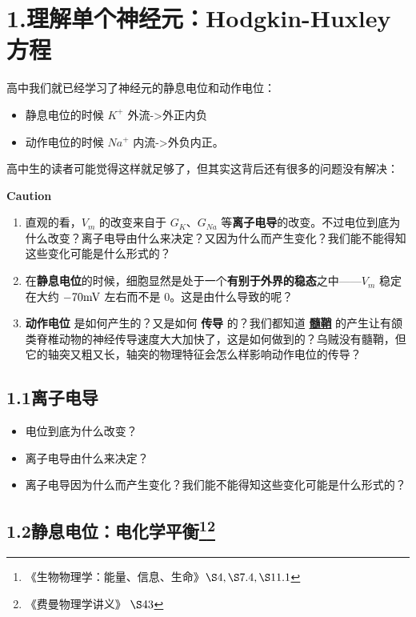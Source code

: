 \documentclass[
]{article}
\begin{document}
\section{1.理解单个神经元：Hodgkin-Huxley
方程}\label{1ux7406ux89e3ux5355ux4e2aux795eux7ecfux5143hodgkin-huxley-ux65b9ux7a0b}

高中我们就已经学习了神经元的静息电位和动作电位：

\begin{itemize}
\item
  静息电位的时候 \(K^+\) 外流-\textgreater 外正内负
\item
  动作电位的时候 \(Na^+\) 内流-\textgreater 外负内正。
\end{itemize}

高中生的读者可能觉得这样就足够了，但其实这背后还有很多的问题没有解决：

\textbf{Caution}\\

\begin{enumerate}
\def\labelenumi{\arabic{enumi}.}
\item
  直观的看，\(V_m\) 的改变来自于 \(G_K\)、\(G_{Na}\)
  等\textbf{离子电导}的改变。不过电位到底为什么改变？离子电导由什么来决定？又因为什么而产生变化？我们能不能得知这些变化可能是什么形式的？
\item
  在\textbf{静息电位}的时候，细胞显然是处于一个\textbf{有别于外界的稳态}之中------\(V_m\)
  稳定在大约 \(-70\rm mV\) 左右而不是 \(0\)。这是由什么导致的呢？
\item
  \textbf{动作电位} 是如何产生的？又是如何 \textbf{传导} 的？我们都知道
  \textbf{\href{https://en.wikipedia.org/wiki/Myelin}{髓鞘}}
  的产生让有颌类脊椎动物的神经传导速度大大加快了，这是如何做到的？乌贼没有髓鞘，但它的轴突又粗又长，轴突的物理特征会怎么样影响动作电位的传导？
\end{enumerate}

\subsection{1.1离子电导}\label{11ux79bbux5b50ux7535ux5bfc}

\begin{itemize}
\item
  电位到底为什么改变？
\item
  离子电导由什么来决定？
\item
  离子电导因为什么而产生变化？我们能不能得知这些变化可能是什么形式的？
\end{itemize}

\subsection[1.2静息电位：电化学平衡]{\texorpdfstring{1.2静息电位：电化学平衡\footnote{《生物物理学：能量、信息、生命》\(\S4,\S7.4,\S11.1\)}\footnote{《费曼物理学讲义》
  \(\S 43\)}}{1.2静息电位：电化学平衡}}\label{12ux9759ux606fux7535ux4f4dux7535ux5316ux5b66ux5e73ux8861ux5cux255E2ux5cux255E3}
\end{document}
